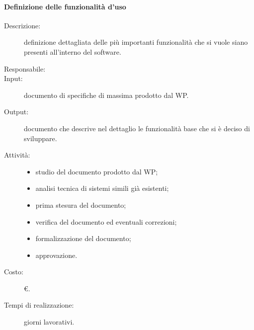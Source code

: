 \paragraph{Definizione delle funzionalità d'uso}
\begin{description}
\item[Descrizione:] definizione dettagliata delle più importanti funzionalità che si vuole siano presenti all'interno del software.
\item[Responsabile:]
\item[Input:] documento di specifiche di massima prodotto dal WP.
\item[Output:] documento che descrive nel dettaglio le funzionalità base che si è deciso di sviluppare.
\item[Attività:]
\begin{itemize}
\item studio del documento prodotto dal WP;
\item analisi tecnica di sistemi simili già esistenti;
\item prima stesura del documento;
\item verifica del documento ed eventuali correzioni;
\item formalizzazione del documento;
\item approvazione.
\end{itemize}
\item[Costo:]  \euro{}.
\item[Tempi di realizzazione:]  giorni lavorativi.
\end{description}


